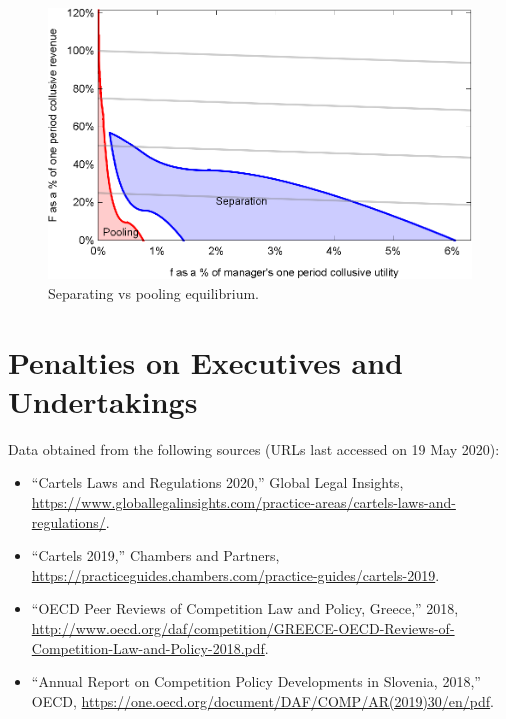 \documentclass[]{article}
\begin{document}
\begin{figure}[ht]
\centering
\includegraphics[scale=0.8]{Plots/Bertrand_N_com_f_F_SepvsPool.eps}
\caption{Separating vs pooling equilibrium.}\label{fig:Nfines_pool_sep}
\end{figure}

\clearpage

\section{Penalties on Executives and Undertakings}\label{app:fines}
Data obtained from the following sources (URLs last accessed on 19 May 2020):
\begin{itemize}\setlength\itemsep{-0.5em}
    \item ``Cartels Laws and Regulations 2020,'' Global Legal Insights, \url{https://www.globallegalinsights.com/practice-areas/cartels-laws-and-regulations/}.
    \item ``Cartels 2019,'' Chambers and Partners, \url{https://practiceguides.chambers.com/practice-guides/cartels-2019}.
    \item ``OECD Peer Reviews of Competition Law and Policy, Greece,'' 2018,  \url{http://www.oecd.org/daf/competition/GREECE-OECD-Reviews-of-Competition-Law-and-Policy-2018.pdf}.
     \item ``Annual Report on Competition Policy Developments in Slovenia, 2018,'' OECD, \url{https://one.oecd.org/document/DAF/COMP/AR(2019)30/en/pdf}.
    
\end{itemize}
\end{document}
